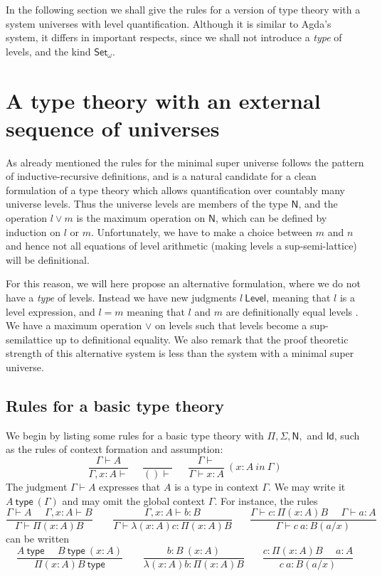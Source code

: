 \documentclass[11pt,a4paper]{article}
\newcommand{\Id}{\mathsf{Id}}
\def\Level{\mathsf{Level}}
\newcommand{\type}{\mathsf{type}}
\newcommand{\N}{\mathsf{N}}
\newcommand{\Set}{\mathsf{Set}}
\begin{document}
In the following section we shall give the rules for a version of type theory with a system universes with level quantification. Although it is similar to Agda's system, it differs in important respects, since we shall not introduce a {\em type} of levels, and the kind $\Set_\omega$.

\section{A type theory with an external sequence of universes}\label{external}

As already mentioned the rules for the minimal super universe follows the pattern of inductive-recursive definitions, and is a natural candidate for a clean formulation of a type theory which allows quantification over countably many universe levels. Thus the universe levels are members of the type $\N$, and the operation $l \vee m$ is the maximum operation on $\N$, which can be defined by induction on $l$ or $m$. Unfortunately, we have to make a choice between $m$ and $n$ and hence not all equations of level arithmetic (making levels a sup-semi-lattice) will be definitional.

For this reason, we will here propose an alternative formulation, where we do not have a {\em type} of levels. Instead we have new judgments $l\ \Level$, meaning that $l$ is a level expression, and $l = m$ meaning that $l$ and $m$ are definitionally equal levels . We have a maximum operation $\vee$ on levels such that levels become a sup-semilattice up to definitional equality. We also remark that the proof theoretic strength of this alternative system is less than the system with a minimal super universe.

\subsection*{Rules for a basic type theory}

We begin by listing some rules for a basic type theory with $\Pi, \Sigma, \N,$ and $\Id$, such as the rules of context formation and assumption:
$$
\frac{\Gamma\vdash A}{\Gamma,x:A\vdash}~~~~~~\frac{}{()\vdash}~~~~~~~
\frac{\Gamma\vdash}{\Gamma\vdash x:A}~(x\!:\! A~in~\Gamma)
$$
The judgment $\Gamma\vdash A$ expresses that $A$ is a type in context $\Gamma$.
We may write it $A~\type~(\Gamma)$ and may omit the global context $\Gamma$.
For instance, the rules
$$
\frac{\Gamma\vdash A~~~~~~\Gamma,x:A\vdash B}{\Gamma\vdash \Pi (x:A) B}~~~~~~~~~
\frac{\Gamma,x:A\vdash b:B}{\Gamma\vdash \lambda (x:A) c:\Pi (x:A) B}~~~~~~~~
\frac{\Gamma\vdash c:\Pi (x:A) B~~~~~~\Gamma\vdash a:A}
     {\Gamma\vdash c~a:B(a/x)}
$$
can be written
$$
\frac{A~\type~~~~~~B~\type~(x:A)}{\Pi (x:A) B~\type}~~~~~~~~~
\frac{b:B~(x:A)}{\lambda (x:A) b:\Pi (x:A) B}~~~~~~~~
\frac{c:\Pi (x:A) B~~~~~~a:A}
     {c~a:B(a/x)}
$$
\end{document}
